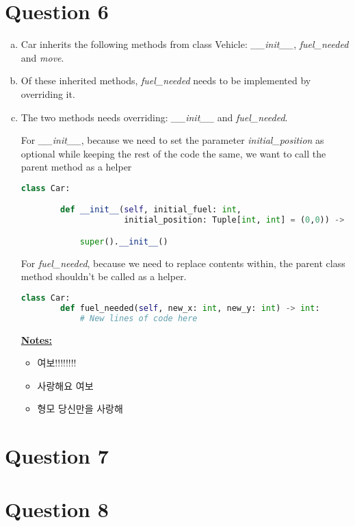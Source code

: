 \documentclass[12pt]{article}
\begin{document}
\section*{Question 6}
\begin{enumerate}[a.]
    \item Car inherits the following methods from class Vehicle: \textit{\_\_init\_\_},
    \textit{fuel\_needed} and \textit{move}.
    \item Of these inherited methods, \textit{fuel\_needed} needs to be
    implemented by overriding it.
    \item

    The two methods needs overriding: \textit{\_\_init\_\_} and \textit{fuel\_needed}.

    \bigskip

    For \textit{\_\_init\_\_}, because we need to set the parameter \textit{initial\_position}
    as optional while keeping the rest of the code the same, we want to call the
    parent method as a helper

    \begin{lstlisting}[language=Python]
    class Car:

        def __init__(self, initial_fuel: int,
                     initial_position: Tuple[int, int] = (0,0)) -> None:

            super().__init__()

    \end{lstlisting}

    \bigskip

    For \textit{fuel\_needed}, because we need to replace contents within, the
    parent class method shouldn't be called as a helper.

    \begin{lstlisting}[language=Python]
    class Car:
        def fuel_needed(self, new_x: int, new_y: int) -> int:
            # New lines of code here

    \end{lstlisting}

    \bigskip

    \underline{\textbf{Notes:}}

    \begin{itemize}
        \item 여보!!!!!!!!
        \item 사랑해요 여보
        \item 형모 당신만을 사랑해
    \end{itemize}


\end{enumerate}


\section*{Question 7}

\section*{Question 8}
\end{document}
